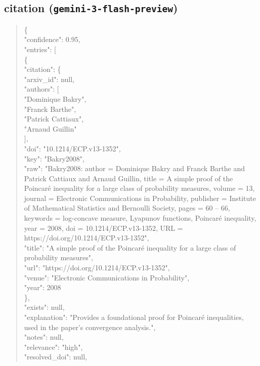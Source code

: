 \documentclass[11pt]{article}
\begin{document}
\subsection*{citation (\texttt{gemini-3-flash-preview})}
\begin{quote}\small\ttfamily\raggedright
\{\\
  "confidence": 0.95,\\
  "entries": [\\
    \{\\
      "citation": \{\\
        "arxiv\_id": null,\\
        "authors": [\\
          "Dominique Bakry",\\
          "Franck Barthe",\\
          "Patrick Cattiaux",\\
          "Arnaud Guillin"\\
        ],\\
        "doi": "10.1214/ECP.v13-1352",\\
        "key": "Bakry2008",\\
        "raw": "Bakry2008: author = Dominique Bakry and Franck Barthe and Patrick Cattiaux and Arnaud Guillin, title = A simple proof of the Poincaré inequality for a large class of probability measures, volume = 13, journal = Electronic Communications in Probability, publisher = Institute of Mathematical Statistics and Bernoulli Society, pages = 60 -- 66, keywords = log-concave measure, Lyapunov functions, Poincaré inequality, year = 2008, doi = 10.1214/ECP.v13-1352, URL = https://doi.org/10.1214/ECP.v13-1352",\\
        "title": "A simple proof of the Poincaré inequality for a large class of probability measures",\\
        "url": "https://doi.org/10.1214/ECP.v13-1352",\\
        "venue": "Electronic Communications in Probability",\\
        "year": 2008\\
      \},\\
      "exists": null,\\
      "explanation": "Provides a foundational proof for Poincaré inequalities, used in the paper's convergence analysis.",\\
      "notes": null,\\
      "relevance": "high",\\
      "resolved\_doi": null,\\

\end{quote}
\end{document}
